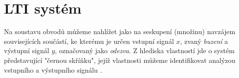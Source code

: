 \setchaptertoc
\chapter{LTI systém}\label{tky:IchII}
    Na soustavu obvodů můžeme nahlížet jako na seskupení (množinu) navzájem souvisejících součástí,
    ke kterému je určen vstupní signál \(x\), zvaný \emph{buzení} a výstupní signál \(y\),
    označovaný jako \emph{odezva}. Z hlediska vlastností jde o systém představující "černou
    skříňku", jejíž vlastnosti můžeme identifikovat analýzou vstupního a výstupního signálu
    \cite{Bicak2007}.   


